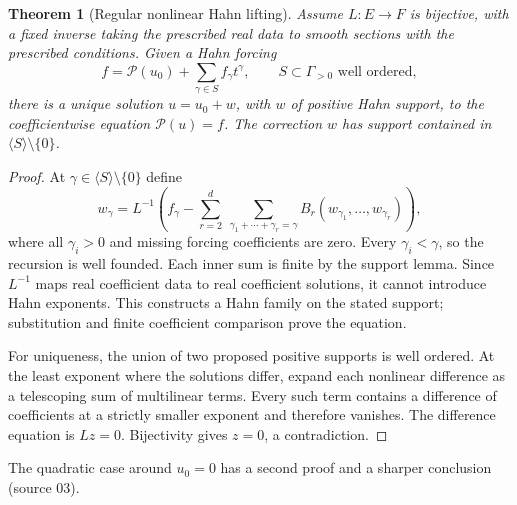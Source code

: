 \documentclass[11pt,letterpaper]{article}
\newtheorem{theorem}{Theorem}[section]
\theoremstyle{definition}
\theoremstyle{remark}
\begin{document}
\begin{theorem}[Regular nonlinear Hahn lifting]\label{vtf:thm:lifting}
Assume $L:E\to F$ is bijective, with a fixed inverse taking the prescribed
real data to smooth sections with the prescribed conditions. Given a Hahn
forcing
\[
 f=\mathcal P(u_0)+\sum_{\gamma\in S}f_\gamma t^\gamma,
 \qquad S\subset\Gamma_{>0}\text{ well ordered},
\]
there is a unique solution $u=u_0+w$, with $w$ of positive Hahn support,
to the coefficientwise equation $\mathcal P(u)=f$. The correction $w$ has
support contained in $\langle S\rangle\setminus\{0\}$.
\end{theorem}
\begin{proof}
At $\gamma\in\langle S\rangle\setminus\{0\}$ define
\begin{equation}\label{vtf:eq:recursion}
 w_\gamma=L^{-1}\left(f_\gamma-
 \sum_{r=2}^d\ \sum_{\gamma_1+\cdots+\gamma_r=\gamma}
 B_r(w_{\gamma_1},\ldots,w_{\gamma_r})\right),
\end{equation}
where all $\gamma_i>0$ and missing forcing coefficients are zero. Every
$\gamma_i<\gamma$, so the recursion is well founded. Each inner sum is
finite by the support lemma. Since $L^{-1}$ maps real coefficient data to
real coefficient solutions, it cannot introduce Hahn exponents.
This constructs a Hahn family on the stated support; substitution and
finite coefficient comparison prove the equation.

For uniqueness, the union of two proposed positive supports is well ordered.
At the least exponent where the solutions differ, expand each nonlinear
difference as a telescoping sum of multilinear terms. Every such term
contains a difference of coefficients at a strictly smaller exponent and
therefore vanishes. The difference equation is $Lz=0$. Bijectivity gives
$z=0$, a contradiction.
\end{proof}

The quadratic case around $u_0=0$ has a second proof and a sharper conclusion
(source 03).
\end{document}
